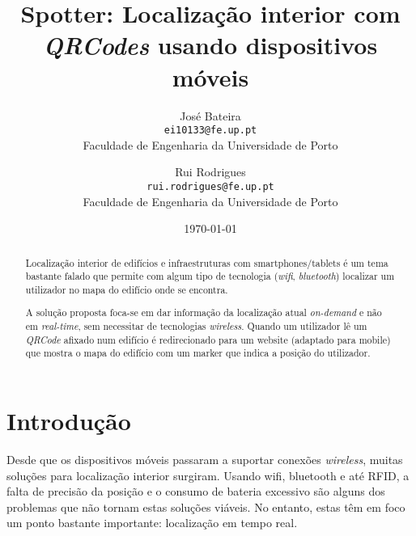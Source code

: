 \documentclass[twocolumn,twoside,11pt]{article}
\title{\vspace{-15mm}\fontsize{24pt}{10pt}\selectfont\textbf{
  Spotter: Localização interior com \emph{QRCodes} usando dispositivos móveis
}}
\author{José Bateira\\
\small \texttt{ei10133@fe.up.pt}\\
\small Faculdade de Engenharia da Universidade de Porto
\and
Rui Rodrigues\\
\small \texttt{rui.rodrigues@fe.up.pt} \\
\small Faculdade de Engenharia da Universidade de Porto
\vspace{-5mm}
}
\date{\today}
\begin{document}
\maketitle
\thispagestyle{plain}            %


\begin{abstract}
Localização interior de edifícios e infraestruturas com smartphones/tablets é um tema bastante falado que permite com algum tipo de tecnologia (\emph{wifi}, \emph{bluetooth}) localizar um utilizador no mapa do edifício onde se encontra.

A solução proposta foca-se em dar informação da localização atual \emph{on-demand} e não em \emph{real-time}, sem necessitar de tecnologias \emph{wireless}. Quando um utilizador lê um \emph{QRCode} afixado num edifício é redirecionado para um website (adaptado para mobile) que mostra o mapa do edifício com um marker que indica a posição do utilizador.

\end{abstract}


\section{Introdução}\label{sec:intro}

  Desde que os dispositivos móveis passaram a suportar conexões \emph{wireless}, muitas soluções para localização interior surgiram.
  Usando wifi, bluetooth e até RFID, a falta de precisão da posição e o consumo de bateria excessivo são alguns dos problemas que não tornam estas soluções viáveis.
  No entanto, estas têm em foco um ponto bastante importante: localização em tempo real.
\end{document}
